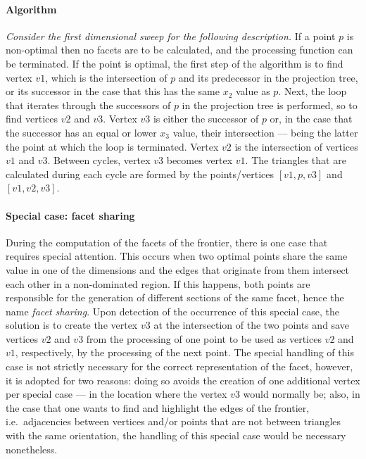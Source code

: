

\paragraph{Algorithm} \textit{Consider the first dimensional sweep for the following description.} If a point $p$ is non-optimal then no facets are to be calculated, and the processing function can be terminated. If the point is optimal, the first step of the algorithm is to find vertex $v1$, which is the intersection of $p$ and its predecessor in the projection tree, or its successor in the case that this has the same $x_2$ value as $p$. Next, the loop that iterates through the successors of $p$ in the projection tree is performed, so to find vertices $v2$ and $v3$. Vertex $v3$ is either the successor of $p$ or, in the case that the successor has an equal or lower $x_3$ value, their intersection --- being the latter the point at which the loop is terminated. Vertex $v2$ is the intersection of vertices $v1$ and $v3$. Between cycles, vertex $v3$ becomes vertex $v1$. The triangles that are calculated during each cycle are formed by the points/vertices $[v1,p,v3]$ and $[v1,v2,v3]$.

\paragraph{Special case: facet sharing} During the computation of the facets of the frontier, there is one case that requires special attention. This occurs when two optimal points share the same value in one of the dimensions and the edges that originate from them intersect each other in a non-dominated region. If this happens, both points are responsible for the generation of different sections of the same facet, hence the name \textit{facet sharing}. Upon detection of the occurrence of this special case, the solution is to create the vertex $v3$ at the intersection of the two points and save vertices $v2$ and $v3$ from the processing of one point to be used as vertices $v2$ and $v1$, respectively, by the processing of the next point. The special handling of this case is not strictly necessary for the correct representation of the facet, however, it is adopted for two reasons: doing so avoids the creation of one additional vertex per special case --- in the location where the vertex $v3$ would normally be; also, in the case that one wants to find and highlight the edges of the frontier, i.e.\ adjacencies between vertices and/or points that are not between triangles with the same orientation, the handling of this special case would be necessary nonetheless. 

